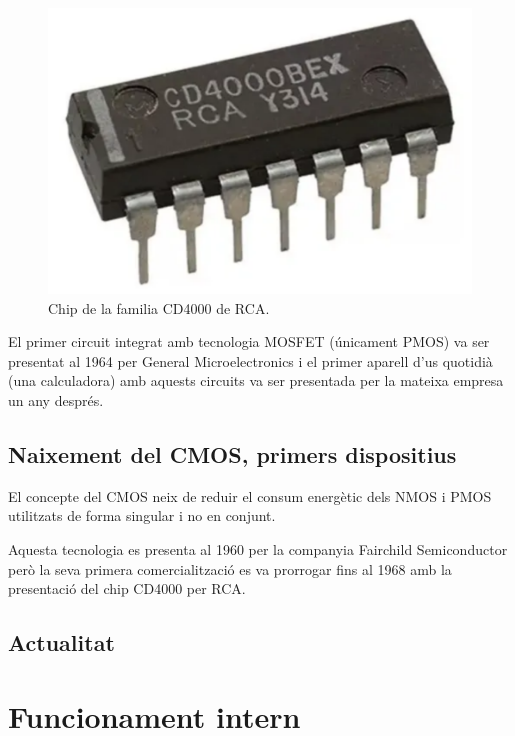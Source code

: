 \documentclass[11pt,a4paper]{article}
\begin{document}
\begin{figure}
    \centering
    \includegraphics[width=\linewidth]{images/rca cd4000 chip.png}
    \caption{Chip de la familia CD4000 de RCA.}
\end{figure}
El primer circuit integrat amb tecnologia MOSFET (únicament PMOS) va ser presentat al 1964 per General Microelectronics i el primer aparell d'us quotidià (una calculadora) amb aquests circuits va ser presentada per la mateixa empresa un any després\autocite{general_microelectronics}.


\subsection{Naixement del CMOS, primers dispositius}


El concepte del CMOS neix de reduir el consum energètic dels NMOS i PMOS utilitzats de forma singular i no en conjunt. 

Aquesta tecnologia es presenta al 1960 per la companyia Fairchild Semiconductor però la seva primera comercialització es va prorrogar fins al 1968 amb la presentació del chip CD4000 per RCA\autocite{wiki:4000-series_integrated_circuits}.




\subsection{Actualitat}

\section{Funcionament intern}
\end{document}
